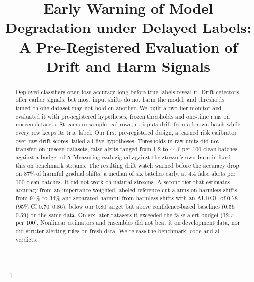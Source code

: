 \documentclass[conference]{IEEEtran}
\providecommand{\anonymous}{1}
\begin{document}
\title{Early Warning of Model Degradation under Delayed Labels:\\ A Pre-Registered Evaluation of Drift and Harm Signals}

\ifnum\anonymous=1
\author{
}
\else
\author{
}
\fi

\maketitle

\begin{abstract}
Deployed classifiers often lose accuracy long before true labels reveal it. Drift detectors offer earlier signals, but most input shifts do not harm the model, and thresholds tuned on one dataset may not hold on another. We built a two-tier monitor and evaluated it with pre-registered hypotheses, frozen thresholds and one-time runs on unseen datasets. Streams re-sample real rows, so inputs drift from a known batch while every row keeps its true label. Our first pre-registered design, a learned risk calibrator over raw drift scores, failed all five hypotheses. Thresholds in raw units did not transfer: on unseen datasets, false alerts ranged from 1.2 to 44.6 per 100 clean batches against a budget of 5. Measuring each signal against the stream's own burn-in fixed this on benchmark streams. The resulting drift watch warned before the accuracy drop on 87\% of harmful gradual shifts, a median of six batches early, at 4.4 false alerts per 100 clean batches. It did not work on natural streams. A second tier that estimates accuracy from an importance-weighted labeled reference cut alarms on harmless shifts from 97\% to 34\% and separated harmful from harmless shifts with an AUROC of 0.78 (95\% CI 0.70--0.86), below our 0.80 target but above confidence-based baselines (0.56--0.59) on the same data. On six later datasets it exceeded the false-alert budget (12.7 per 100). Nonlinear estimators and ensembles did not beat it on development data, nor did stricter alerting rules on fresh data. We release the benchmark, code and all verdicts.
\end{abstract}
\end{document}
